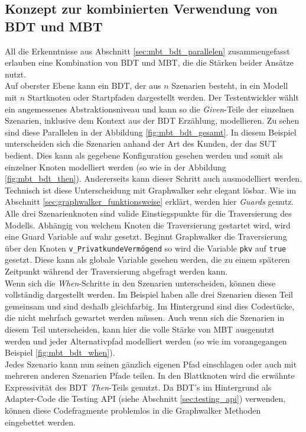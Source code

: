 \subsection{Konzept zur kombinierten Verwendung von BDT und MBT}
\label{sec:mbt_bdt_concept}
All die Erkenntnisse aus Abschnitt \ref{sec:mbt_bdt_parallelen} zusammengefasst erlauben eine Kombination von \Gls{BDT} und \Gls{MBT}, die die Stärken beider Ansätze nutzt.\\
Auf oberster Ebene kann ein \Gls{BDT}, der aus $n$ Szenarien besteht, in ein Modell mit $n$ Startknoten oder Startpfaden dargestellt werden. Der Testentwickler wählt ein angemessenes Abstraktionsniveau und kann so die \textit{Given}-Teile der einzelnen Szenarien, inklusive dem Kontext aus der \Gls{BDT} Erzählung, modellieren. Zu sehen sind diese Parallelen in der Abbildung \ref{fig:mbt_bdt_gesamt}. In diesem Beispiel unterscheiden sich die Szenarien anhand der Art des Kunden, der das \Gls{SUT} bedient. Dies kann als gegebene Konfiguration gesehen werden und somit als einzelner Knoten modelliert werden (so wie in der Abbildung \ref{fig:mbt_bdt_then}). Andererseits kann dieser Schritt auch ausmodelliert werden. Technisch ist diese Unterscheidung mit Graphwalker sehr elegant lösbar. Wie im Abschnitt \ref{sec:graphwalker_funktionsweise}  erklärt, werden hier \textit{Guards} genutz. Alle drei Szenarienknoten sind valide Einstiegspunkte für die Traversierung des Modells. Abhängig von welchem Knoten die Traversierung gestartet wird, wird eine Guard Variable auf wahr gesetzt. Beginnt Graphwalker die Traversierung über den Knoten \texttt{v\_PrivatkundeVermögend} so wird die Variable \texttt{pkv} auf \texttt{true} gesetzt. Diese kann als globale Variable gesehen werden, die zu einem späteren Zeitpunkt während der Traversierung abgefragt werden kann.\\
Wenn sich die \textit{When}-Schritte in den Szenarien unterscheiden, können diese vollständig dargestellt werden. Im Beispiel haben alle drei Szenarien diesen Teil gemeinsam und sind deshalb gleichfarbig. Im Hintergrund sind dies Codestücke, die nicht mehrfach gewartet werden müssen. Auch wenn sich die Szenarien in diesem Teil unterscheiden, kann hier die volle Stärke von \Gls{MBT} ausgenutzt werden und jeder Alternativpfad modelliert werden (so wie im vorangegangen Beispiel \ref{fig:mbt_bdt_when}).\\
Jedes Szenario kann nun seinen gänzlich eigenen Pfad einschlagen oder auch mit mehreren anderen Szenarien Pfade teilen. In den Blattknoten wird die erwähnte Expressivität des \Gls{BDT} \textit{Then}-Teils genutzt. Da \Gls{BDT}'s im Hintergrund als Adapter-Code die Testing API (siehe Abschnitt \ref{sec:testing_api}) verwenden, können diese Codefragmente problemlos in die Graphwalker Methoden eingebettet werden.\\
